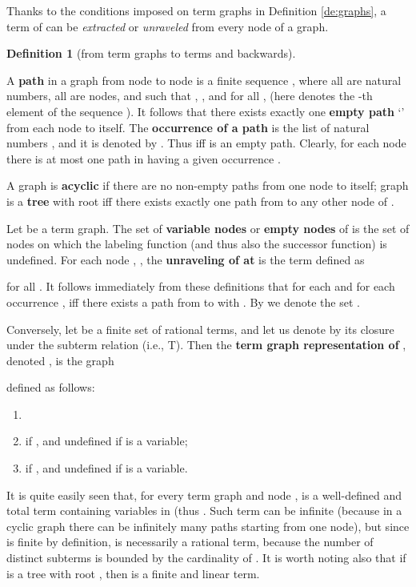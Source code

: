 \documentclass{eptcs}
\theoremstyle{plain}
\theoremstyle{definition}
\newtheorem{definition}[theorem]{Definition}
\begin{document}
Thanks to the conditions imposed on term graphs
in Definition \ref{de:graphs}, a term of  can be 
{\em extracted} or {\em unraveled} from every node of a graph.

\begin{definition}
[from term graphs to terms and backwards]
\label{de:from term graphs to terms}

A {\bf path}  in a graph
 from node  to node  is a finite sequence 
,
where all  are natural numbers, all  
are nodes, and such that , , and for all ,  (here  denotes the -th element of the
sequence ). It follows that there exists exactly one {\bf empty 
path} `' from each node  to itself.
The {\bf occurrence of a path}  is the list of natural numbers 
, and it is denoted by . Thus 
 iff  is an empty path. Clearly, 
for each node  there is at most one path in  having a given 
occurrence . 

A graph  is
{\bf acyclic} if there are  no non-empty paths from one node to 
itself; graph  is a {\bf tree} with root  
iff there
exists exactly one path from  to any other node of .
  
Let  be a term graph. The set  
of {\bf variable
nodes\/} or {\bf empty nodes} of  is the set of nodes on which the 
labeling function (and thus also the successor function) is undefined.
For each node , 
, the {\bf unraveling of  at } is the term 
defined as

for all . It follows immediately from these definitions 
that for each  and for each occurrence ,  iff there exists a path  from  to  
with . By  we denote the set 
.


Conversely, let  be a finite set of rational terms, and let us 
denote by  its
closure under the subterm relation (i.e., T). Then the 
{\bf term graph representation of }, denoted , is the 
graph  
 
defined as 
follows:
\begin{enumerate}
\item

\item 
 \quad
if , and undefined if  is a variable;
\item 
 \quad
if , and undefined if  is a variable.
\end{enumerate}
\end{definition}

It is quite easily seen that, for every term graph  and 
node ,  is a well-defined and total term 
containing
variables in  (thus .
Such term can be infinite (because in a cyclic
graph there can be infinitely many paths starting from one node), but 
since  is finite by definition,  is
necessarily a rational term, because
the number of distinct subterms is bounded by the 
cardinality of . It is worth noting also that if  is a tree 
with
root , then  is a finite and 
linear 
term.
\end{document}
